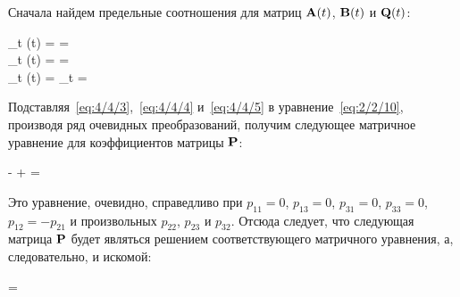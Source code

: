 Сначала найдем предельные соотношения для матриц $\mathbf{A}(t)$, $\mathbf{B}(t)$ и $\mathbf{Q}(t)$:

\beqarr
        \lim\limits_{t \to \infty}(t) =  =  \text{;} \\
        \lim\limits_{t \to \infty}(t) =  =  \text{;} \\
        \lim\limits_{t \to \infty}(t) = \lim\limits_{t \to \infty}  =  
\eeqarr

Подставляя~\ref{eq:4/4/3},~\ref{eq:4/4/4} и~\ref{eq:4/4/5} в уравнение~\ref{eq:2/2/10}, производя ряд очевидных преобразований, получим следующее матричное уравнение для коэффициентов матрицы $\mathbf{P}$:

    -  +  =  
\eeq

Это уравнение, очевидно, справедливо при $p_{11}=0$, $p_{13}=0$, $p_{31}=0$, $p_{33}=0$, $p_{12} = -p_{21}$ и произвольных $p_{22}$, $p_{23}$ и $p_{32}$. Отсюда следует, что следующая матрица $\mathbf{P}$ будет являться решением соответствующего матричного уравнения, а, следовательно, и искомой:

     =  
\eeq

